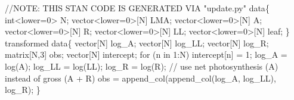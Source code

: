\documentclass[
  12pt,
  letterpaper,
  DIV=11,
  numbers=noendperiod]{scrartcl}
\newenvironment{Shaded}{\begin{snugshade}}{\end{snugshade}}
\newcommand{\AlertTok}[1]{\textcolor[rgb]{0.68,0.00,0.00}{#1}}
\newcommand{\CommentTok}[1]{\textcolor[rgb]{0.37,0.37,0.37}{#1}}
\newcommand{\ControlFlowTok}[1]{\textcolor[rgb]{0.00,0.23,0.31}{#1}}
\newcommand{\DataTypeTok}[1]{\textcolor[rgb]{0.68,0.00,0.00}{#1}}
\newcommand{\DecValTok}[1]{\textcolor[rgb]{0.68,0.00,0.00}{#1}}
\newcommand{\KeywordTok}[1]{\textcolor[rgb]{0.00,0.23,0.31}{#1}}
\newcommand{\NormalTok}[1]{\textcolor[rgb]{0.00,0.23,0.31}{#1}}
\begin{document}
\begin{Shaded}
\begin{Highlighting}[]
\CommentTok{//}\AlertTok{NOTE}\CommentTok{: THIS STAN CODE IS GENERATED VIA "update.py"}
\KeywordTok{data}\NormalTok{\{}
  \DataTypeTok{int}\NormalTok{\textless{}}\KeywordTok{lower}\NormalTok{=}\DecValTok{0}\NormalTok{\textgreater{} N;}
  \DataTypeTok{vector}\NormalTok{\textless{}}\KeywordTok{lower}\NormalTok{=}\DecValTok{0}\NormalTok{\textgreater{}[N] LMA;}
  \DataTypeTok{vector}\NormalTok{\textless{}}\KeywordTok{lower}\NormalTok{=}\DecValTok{0}\NormalTok{\textgreater{}[N] A;}
  \DataTypeTok{vector}\NormalTok{\textless{}}\KeywordTok{lower}\NormalTok{=}\DecValTok{0}\NormalTok{\textgreater{}[N] R;}
  \DataTypeTok{vector}\NormalTok{\textless{}}\KeywordTok{lower}\NormalTok{=}\DecValTok{0}\NormalTok{\textgreater{}[N] LL;}
  \DataTypeTok{vector}\NormalTok{\textless{}}\KeywordTok{lower}\NormalTok{=}\DecValTok{0}\NormalTok{\textgreater{}[N] leaf;}
\NormalTok{\}}
\KeywordTok{transformed data}\NormalTok{\{}
  \DataTypeTok{vector}\NormalTok{[N] log\_A;}
  \DataTypeTok{vector}\NormalTok{[N] log\_LL;}
  \DataTypeTok{vector}\NormalTok{[N] log\_R;}
  \DataTypeTok{matrix}\NormalTok{[N,}\DecValTok{3}\NormalTok{] obs;}
  \DataTypeTok{vector}\NormalTok{[N] intercept;}
  \ControlFlowTok{for}\NormalTok{ (n }\ControlFlowTok{in} \DecValTok{1}\NormalTok{:N)}
\NormalTok{    intercept[n] = }\DecValTok{1}\NormalTok{;}
\NormalTok{  log\_A = log(A);}
\NormalTok{  log\_LL = log(LL);}
\NormalTok{  log\_R = log(R);}
  \CommentTok{// use net photosynthesis (A) instead of gross (A + R)}
\NormalTok{  obs = append\_col(append\_col(log\_A, log\_LL), log\_R);}
\NormalTok{\}}


\end{Highlighting}
\end{Shaded}
\end{document}
